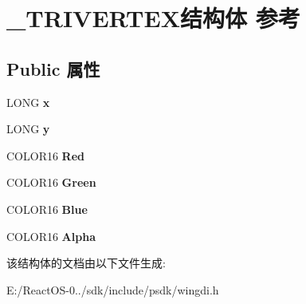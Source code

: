 \hypertarget{struct___t_r_i_v_e_r_t_e_x}{}\section{\+\_\+\+T\+R\+I\+V\+E\+R\+T\+E\+X结构体 参考}
\label{struct___t_r_i_v_e_r_t_e_x}
\subsection*{Public 属性}
\begin{DoxyCompactItemize}
\item 
\mbox{\label{struct___t_r_i_v_e_r_t_e_x_af93744357a0a767e23df2450b17c0449}} 
L\+O\+NG {\bfseries x}
\item 
\mbox{\label{struct___t_r_i_v_e_r_t_e_x_a522739afe260ce6efaa476ef7101bd70}} 
L\+O\+NG {\bfseries y}
\item 
\mbox{\label{struct___t_r_i_v_e_r_t_e_x_a45d05815e0bdcbed27ed49c83d56b8e3}} 
C\+O\+L\+O\+R16 {\bfseries Red}
\item 
\mbox{\label{struct___t_r_i_v_e_r_t_e_x_a95bfbc6b546387cbc918bdc30c3cb8fc}} 
C\+O\+L\+O\+R16 {\bfseries Green}
\item 
\mbox{\label{struct___t_r_i_v_e_r_t_e_x_abcdaa25df4040905651beeb8d16a8c4f}} 
C\+O\+L\+O\+R16 {\bfseries Blue}
\item 
\mbox{\label{struct___t_r_i_v_e_r_t_e_x_aa71f1a206edc5d193057b7793052ab63}} 
C\+O\+L\+O\+R16 {\bfseries Alpha}
\end{DoxyCompactItemize}


该结构体的文档由以下文件生成\+:\begin{DoxyCompactItemize}
\item 
E\+:/\+React\+O\+S-\/0../sdk/include/psdk/wingdi.\+h\end{DoxyCompactItemize}
